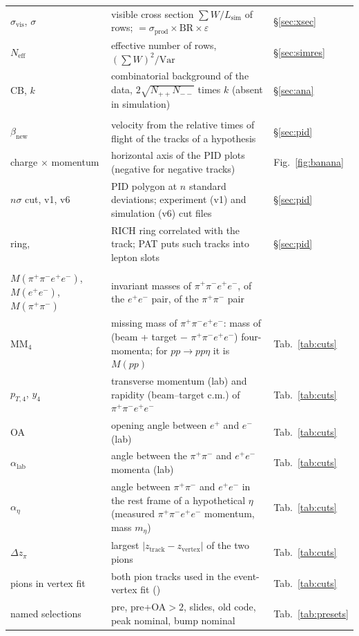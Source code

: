 \documentclass[11pt,a4paper]{article}
\newcommand{\ee}{\ensuremath{e^{+}e^{-}}\xspace}
\newcommand{\pipi}{\ensuremath{\pi^{+}\pi^{-}}\xspace}
\newcommand{\ppee}{\ensuremath{\pi^{+}\pi^{-}e^{+}e^{-}}\xspace}
\newcommand{\Mfour}{\ensuremath{M(\pi^{+}\pi^{-}e^{+}e^{-})}\xspace}
\newcommand{\Mee}{\ensuremath{M(e^{+}e^{-})}\xspace}
\newcommand{\Mpipi}{\ensuremath{M(\pi^{+}\pi^{-})}\xspace}
\newcommand{\betanew}{\ensuremath{\beta_{\mathrm{new}}}\xspace}
\newcommand{\Lsim}{\ensuremath{L_{\mathrm{sim}}}\xspace}
\newcommand{\code}[1]{\texttt{\detokenize{#1}}}
\begin{document}
{\begin{longtable}{@{}>{\raggedright\arraybackslash}p{3.0cm} >{\raggedright\arraybackslash}p{\dimexpr\textwidth-3.0cm-2.2cm-4\tabcolsep\relax} >{\raggedright\arraybackslash}p{2.2cm}@{}}
$\sigma_{\mathrm{vis}}$, $\sigma$ & visible cross section $\sum W/\Lsim$ of rows; $=\sigma_{\mathrm{prod}}\times\mathrm{BR}\times\varepsilon$ & \S\ref{sec:xsec} \\
$N_{\mathrm{eff}}$ & effective number of rows, $(\sum W)^2/\mathrm{Var}$ & \S\ref{sec:simres} \\
CB, $k$ & combinatorial background of the data, $2\sqrt{N_{++}N_{--}}$ times $k$ (absent in simulation) & \S\ref{sec:ana} \\
\midrule
\multicolumn{3}{@{}l}{\textbf{Particle identification}} \\
$\betanew$ & velocity from the relative times of flight of the tracks of a hypothesis & \S\ref{sec:pid} \\
charge $\times$ momentum & horizontal axis of the PID plots (negative for negative tracks) & Fig.~\ref{fig:banana} \\
$n\sigma$ cut, v1, v6 & PID polygon at $n$ standard deviations; experiment (v1) and simulation (v6) cut files & \S\ref{sec:pid} \\
ring, \code{kIsLepton} & RICH ring correlated with the track; PAT puts such tracks into lepton slots & \S\ref{sec:pid} \\
\midrule
\multicolumn{3}{@{}l}{\textbf{Kinematics and cuts}} \\
\Mfour, \Mee, \Mpipi & invariant masses of \ppee, of the \ee pair, of the \pipi pair & \\
$\mathrm{MM}_4$ & missing mass of \ppee: mass of (beam + target $-$ \ppee) four-momenta; for $pp\to pp\eta$ it is $M(pp)$ & Tab.~\ref{tab:cuts} \\
$p_{T,4}$, $y_4$ & transverse momentum (lab) and rapidity (beam--target c.m.) of \ppee & Tab.~\ref{tab:cuts} \\
OA & opening angle between $e^+$ and $e^-$ (lab) & Tab.~\ref{tab:cuts} \\
$\alpha_{\mathrm{lab}}$ & angle between the \pipi and \ee momenta (lab) & Tab.~\ref{tab:cuts} \\
$\alpha_\eta$ & angle between \pipi and \ee in the rest frame of a hypothetical $\eta$ (measured \ppee momentum, mass $m_\eta$) & Tab.~\ref{tab:cuts} \\
$\Delta z_\pi$ & largest $|z_{\mathrm{track}}-z_{\mathrm{vertex}}|$ of the two pions & Tab.~\ref{tab:cuts} \\
pions in vertex fit & both pion tracks used in the event-vertex fit (\code{isUsedVertex}) & Tab.~\ref{tab:cuts} \\
named selections & pre, pre+OA$>2$, slides, old code, peak nominal, bump nominal & Tab.~\ref{tab:presets} \\

\end{longtable}}
\end{document}
